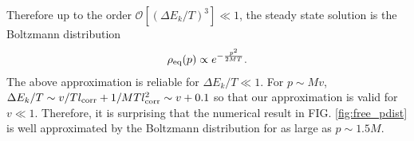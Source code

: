 \documentclass[prd,11pt, amsmath, amsymb, aps, reprint, tightenlines, nofootinbib, longbibliography, abbrv, preprintnumbers]{revtex4-1}
\begin{document}
Therefore up to the order $\mathcal O[(\Delta E_k/T)^3] \ll 1$, the steady state solution is the Boltzmann distribution
\begin{align}
\rho_{\rm eq}(p) \propto e^{-\frac{p^2}{2MT}}.
\end{align}
The above approximation is reliable for $\Delta E_k/T \ll 1$.
For $p\sim Mv$,  $\Delta E_k/T \sim v/Tl_{\rm corr} + 1/MTl_{\rm corr}^2\sim v+0.1$ so that our approximation is valid for $v \ll 1$.
Therefore, it is surprising that the numerical result in FIG. \ref{fig:free_pdist} is well approximated by the Boltzmann distribution for as large as $p\sim 1.5M$.


\end{document}
